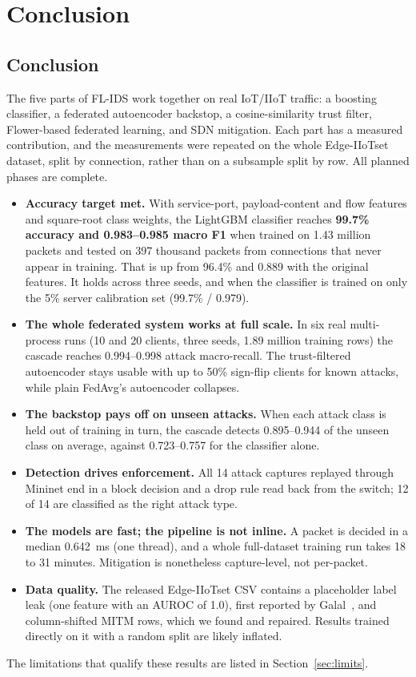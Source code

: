 \chapter{Conclusion}\label{chap:conclusion}

\section*{Conclusion}
The five parts of FL-IDS work together on real IoT/IIoT traffic: a boosting classifier, a federated autoencoder backstop, a cosine-similarity trust filter, Flower-based federated learning, and SDN mitigation. Each part has a measured contribution, and the measurements were repeated on the whole Edge-IIoTset dataset, split by connection, rather than on a subsample split by row. All planned phases are complete.

\begin{itemize}
  \item \textbf{Accuracy target met.} With service-port, payload-content and flow features and square-root class weights, the LightGBM classifier reaches \textbf{99.7\% accuracy and 0.983--0.985 macro F1} when trained on 1.43 million packets and tested on 397 thousand packets from connections that never appear in training. That is up from 96.4\% and 0.889 with the original features. It holds across three seeds, and when the classifier is trained on only the 5\% server calibration set (99.7\% / 0.979).
  \item \textbf{The whole federated system works at full scale.} In six real multi-process runs (10 and 20 clients, three seeds, 1.89 million training rows) the cascade reaches 0.994--0.998 attack macro-recall. The trust-filtered autoencoder stays usable with up to 50\% sign-flip clients for known attacks, while plain FedAvg's autoencoder collapses.
  \item \textbf{The backstop pays off on unseen attacks.} When each attack class is held out of training in turn, the cascade detects 0.895--0.944 of the unseen class on average, against 0.723--0.757 for the classifier alone.
  \item \textbf{Detection drives enforcement.} All 14 attack captures replayed through Mininet end in a block decision and a drop rule read back from the switch; 12 of 14 are classified as the right attack type.
  \item \textbf{The models are fast; the pipeline is not inline.} A packet is decided in a median 0.642~ms (one thread), and a whole full-dataset training run takes 18 to 31 minutes. Mitigation is nonetheless capture-level, not per-packet.
  \item \textbf{Data quality.} The released Edge-IIoTset CSV contains a placeholder label leak (one feature with an AUROC of 1.0), first reported by Galal~\cite{galal2026provenance}, and column-shifted MITM rows, which we found and repaired. Results trained directly on it with a random split are likely inflated.
\end{itemize}
The limitations that qualify these results are listed in Section~\ref{sec:limits}.

